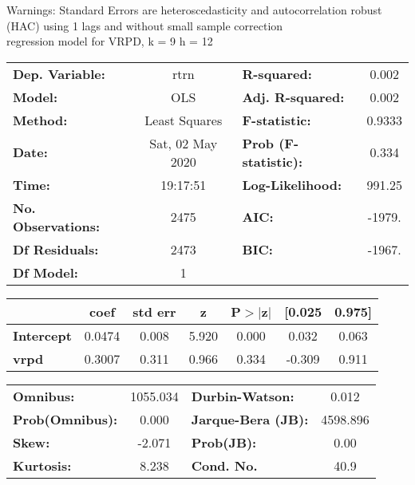 Warnings: \newline
 [1] Standard Errors are heteroscedasticity and autocorrelation robust (HAC) using 1 lags and without small sample correction\\ 

regression model for VRPD, k = 9 h = 12\begin{center}
\begin{tabular}{lclc}
\toprule
\textbf{Dep. Variable:}    &       rtrn       & \textbf{  R-squared:         } &     0.002   \\
\textbf{Model:}            &       OLS        & \textbf{  Adj. R-squared:    } &     0.002   \\
\textbf{Method:}           &  Least Squares   & \textbf{  F-statistic:       } &    0.9333   \\
\textbf{Date:}             & Sat, 02 May 2020 & \textbf{  Prob (F-statistic):} &    0.334    \\
\textbf{Time:}             &     19:17:51     & \textbf{  Log-Likelihood:    } &    991.25   \\
\textbf{No. Observations:} &        2475      & \textbf{  AIC:               } &    -1979.   \\
\textbf{Df Residuals:}     &        2473      & \textbf{  BIC:               } &    -1967.   \\
\textbf{Df Model:}         &           1      & \textbf{                     } &             \\
\bottomrule
\end{tabular}
\begin{tabular}{lcccccc}
                   & \textbf{coef} & \textbf{std err} & \textbf{z} & \textbf{P$> |$z$|$} & \textbf{[0.025} & \textbf{0.975]}  \\
\midrule
\textbf{Intercept} &       0.0474  &        0.008     &     5.920  &         0.000        &        0.032    &        0.063     \\
\textbf{vrpd}      &       0.3007  &        0.311     &     0.966  &         0.334        &       -0.309    &        0.911     \\
\bottomrule
\end{tabular}
\begin{tabular}{lclc}
\textbf{Omnibus:}       & 1055.034 & \textbf{  Durbin-Watson:     } &    0.012  \\
\textbf{Prob(Omnibus):} &   0.000  & \textbf{  Jarque-Bera (JB):  } & 4598.896  \\
\textbf{Skew:}          &  -2.071  & \textbf{  Prob(JB):          } &     0.00  \\
\textbf{Kurtosis:}      &   8.238  & \textbf{  Cond. No.          } &     40.9  \\
\bottomrule
\end{tabular}
\end{center}

